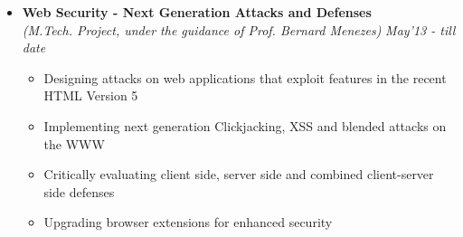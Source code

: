 \begin{itemize}
\item \textbf{Web Security - Next Generation Attacks and Defenses} \\
      \emph{(M.Tech. Project, under the guidance of Prof. Bernard Menezes)} \hfill {\emph{May'13 - till date}} \\[-0.6cm]
      \begin{itemize}
	    \item Designing attacks on web applications that exploit features in the recent HTML Version 5 \\[-0.5cm]
	    \item Implementing next generation Clickjacking, XSS and blended attacks on the WWW  \\[-0.5cm]
	    \item Critically evaluating client side, server side and combined client-server side defenses \\[-0.5cm]
	    \item Upgrading browser extensions for enhanced security
      \end{itemize}
\end{itemize}
